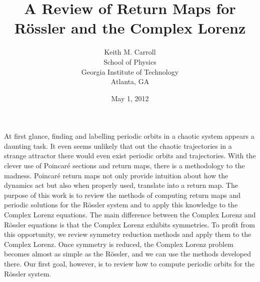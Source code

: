\documentclass[10pt,letter]{article}
\begin{document}
\title{A Review of Return Maps for R\"ossler and the Complex Lorenz}
\author{Keith M. Carroll\\ School of Physics
        \\ Georgia Institute of Technology \\ Atlanta, GA}
\date{May 1, 2012}
\maketitle
At first glance, finding and labelling periodic orbits in a chaotic
system appears a daunting task.  It even seems unlikely that out the
chaotic trajectories in a strange attractor there would even exist
periodic orbits and trajectories.  With the clever use of Poincar\'e
sections and return maps, there is a methodology to the madness.
Poincar\'e return maps not only provide intuition about how the dynamics
act but also when properly used, translate into a return map.  The
purpose of this work is to review the methods of computing return maps
and periodic solutions for the R\"ossler system and to apply this
knowledge to the Complex Lorenz equations.  The main difference between
the Complex Lorenz and R\"ossler equations is that the Complex Lorenz
exhibits symmetries.  To profit from this opportunity, we review symmetry
reduction methods and apply them to the Complex Lorenz.  Once symmetry is
reduced, the Complex Lorenz problem becomes almost as simple as the
R\"ossler, and we can use the methods developed there.  Our first goal,
however, is to review how to compute periodic orbits for the R\"ossler
system.
\end{document}
